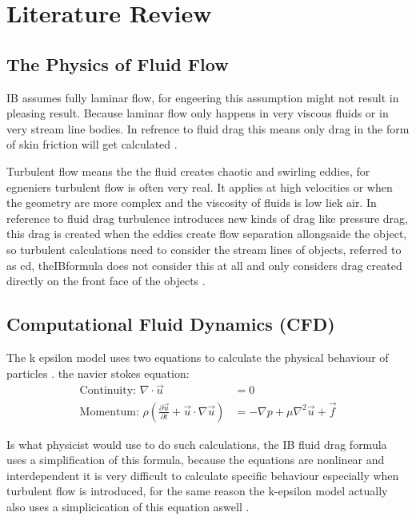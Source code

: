 \documentclass[12pt,a4paper]{article}
\begin{document}
\section{Literature Review}

\subsection{The Physics of Fluid Flow}

IB assumes fully laminar flow, for engeering this assumption might not result in pleasing result. Because laminar flow only happens in very viscous fluids or in very stream line bodies. In refrence to fluid drag this means only drag in the form of skin friction will get calculated \cite{tsokos2014physics}.

Turbulent flow means the the fluid creates chaotic and swirling eddies, for egneniers turbulent flow is often very real. It applies at high velocities or when the geometry are more complex and the viscosity of fluids is low liek air. In reference to fluid drag turbulence introduces new kinds of drag like pressure drag, this drag is created when the eddies create flow separation allongsaide the object, so turbulent calculations need to consider the stream lines of objects, referred to as cd, theIBformula does not consider this at all and only considers drag created directly on the front face of the objects \cite{anderson2016fundamentals}. 

\subsection{Computational Fluid Dynamics (CFD)}

The k epsilon model uses two equations to calculate the physical behaviour of particles \cite{launder1974application}.
the navier stokes equation: 
\begin{align}
\text{Continuity: } \nabla \cdot \vec{u} &= 0\\
\text{Momentum: } \rho\left(\frac{\partial \vec{u}}{\partial t} + \vec{u} \cdot \nabla \vec{u}\right) &= -\nabla p + \mu \nabla^2 \vec{u} + \vec{f}
\end{align}

Is what physicist would use to do such calculations, the IB fluid drag formula uses a simplification of this formula, because the equations are nonlinear and interdependent it is very difficult to calculate specific behaviour especially when turbulent flow is introduced, for the same reason the k-epsilon model actually also uses a simplicication of this equation aswell \cite{white2015fluid}.
\end{document}

